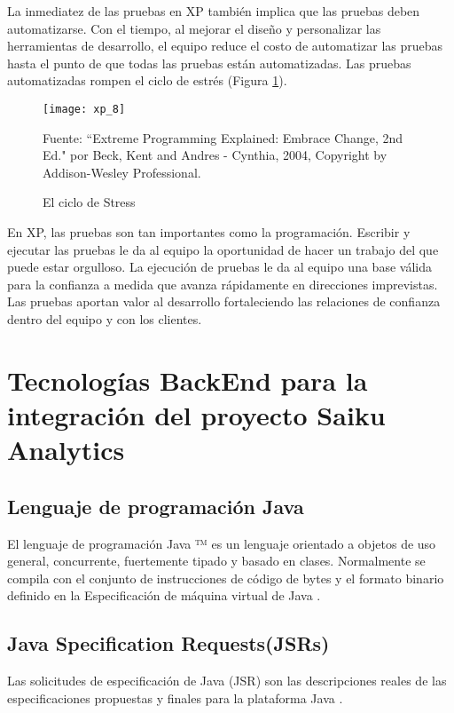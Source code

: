 \begin{spacing}{1.5}
		La inmediatez de las pruebas en XP también implica que las pruebas deben automatizarse. Con el tiempo, al mejorar el diseño y personalizar las herramientas de desarrollo, el equipo reduce el costo de automatizar las pruebas hasta el punto de que todas las pruebas están automatizadas. Las pruebas automatizadas rompen el ciclo de estrés (Figura \ref{figure:chaperII_9}).
		
		\begin{figure}[H]
			\centering
			\texttt{[image: xp\_8]}
			\caption {\centering \small{El ciclo de Stress}} \label{figure:chaperII_9}
			\small {Fuente: ``Extreme Programming Explained: Embrace Change, 2nd Ed." por Beck, Kent and Andres - Cynthia, 2004, Copyright by Addison-Wesley Professional.}
		\end{figure}
		
		En XP, las pruebas son tan importantes como la programación. Escribir y ejecutar las pruebas le da al equipo la oportunidad de hacer un trabajo del que puede estar orgulloso. La ejecución de pruebas le da al equipo una base válida para la confianza a medida que avanza rápidamente en direcciones imprevistas. Las pruebas aportan valor al desarrollo fortaleciendo las relaciones de confianza dentro del equipo y con los clientes.
\section{Tecnolog\'{i}as BackEnd para la integraci\'{o}n del proyecto Saiku Analytics}
	\subsection{Lenguaje de programaci\'{o}n Java}
		El lenguaje de programación Java ™ es un lenguaje orientado a objetos de uso general, concurrente, fuertemente tipado y basado en clases. Normalmente se compila con el conjunto de instrucciones de código de bytes y el formato binario definido en la Especificación de máquina virtual de Java \cite{chap2_java}.
	\subsection{Java Specification Requests(JSRs)}
		Las solicitudes de especificación de Java (JSR) son las descripciones reales de las especificaciones propuestas y finales para la plataforma Java \cite{chap2_jsr}.

\end{spacing}
